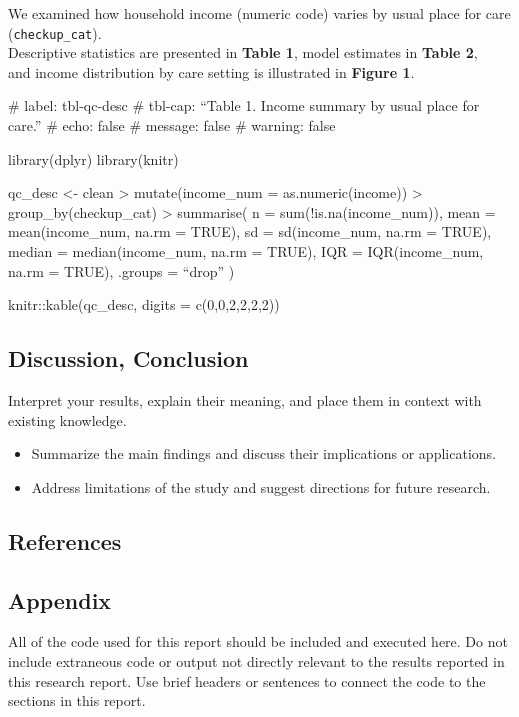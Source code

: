 \documentclass[
  letterpaper,
  DIV=11,
  numbers=noendperiod]{scrartcl}
\providecommand{\tightlist}{%
  \setlength{\itemsep}{0pt}\setlength{\parskip}{0pt}}\usepackage{longtable,booktabs,array}
\newlength{\cslhangindent}
\newenvironment{CSLReferences}[2] %
 {\begin{list}{}{%
  \setlength{\itemindent}{0pt}
  \setlength{\leftmargin}{0pt}
  \setlength{\parsep}{0pt}
  \ifodd #1
   \setlength{\leftmargin}{\cslhangindent}
   \setlength{\itemindent}{-1\cslhangindent}
  \fi
  \setlength{\itemsep}{#2\baselineskip}}}
 {\end{list}}
\begin{document}
We examined how household income (numeric code) varies by usual place
for care (\texttt{checkup\_cat}).\\
Descriptive statistics are presented in \textbf{Table 1}, model
estimates in \textbf{Table 2},\\
and income distribution by care setting is illustrated in \textbf{Figure
1}.

\#\textbar{} label: tbl-qc-desc \#\textbar{} tbl-cap: ``Table 1. Income
summary by usual place for care.'' \#\textbar{} echo: false \#\textbar{}
message: false \#\textbar{} warning: false

library(dplyr) library(knitr)

qc\_desc \textless- clean \textbar\textgreater{} mutate(income\_num =
as.numeric(income)) \textbar\textgreater{} group\_by(checkup\_cat)
\textbar\textgreater{} summarise( n = sum(!is.na(income\_num)), mean =
mean(income\_num, na.rm = TRUE), sd = sd(income\_num, na.rm = TRUE),
median = median(income\_num, na.rm = TRUE), IQR = IQR(income\_num, na.rm
= TRUE), .groups = ``drop'' )

knitr::kable(qc\_desc, digits = c(0,0,2,2,2,2))

\subsection{Discussion, Conclusion}\label{sec-discussino}

Interpret your results, explain their meaning, and place them in context
with existing knowledge.

\begin{itemize}
\tightlist
\item
  Summarize the main findings and discuss their implications or
  applications.
\item
  Address limitations of the study and suggest directions for future
  research.
\end{itemize}

\subsection{References}\label{references}

\label{refs}
\begin{CSLReferences}{0}{1}
\end{CSLReferences}

\subsection{Appendix}\label{appendix}

All of the code used for this report should be included and executed
here. Do not include extraneous code or output not directly relevant to
the results reported in this research report. Use brief headers or
sentences to connect the code to the sections in this report.
\end{document}
